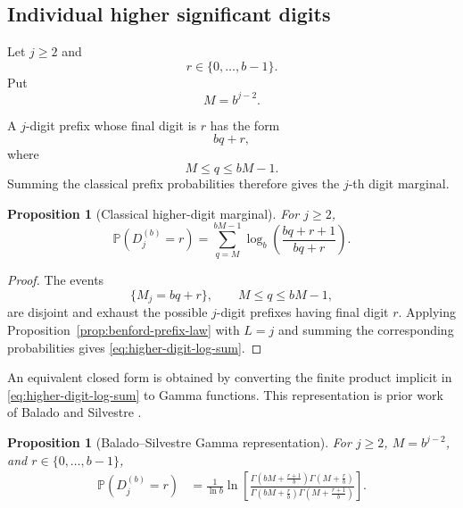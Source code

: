 \documentclass[11pt]{article}
\newtheorem{proposition}[theorem]{Proposition}
\theoremstyle{definition}
\theoremstyle{remark}
\begin{document}
\subsection{Individual higher significant digits}
\label{subsec:higher-digit-laws}

Let \(j\ge2\) and
\[
    r\in\{0,\ldots,b-1\}.
\]
Put
\begin{equation}
    M=b^{j-2}.
    \label{eq:M-j-definition}
\end{equation}

A \(j\)-digit prefix whose final digit is \(r\) has the form
\[
    bq+r,
\]
where
\[
    M\le q\le bM-1.
\]
Summing the classical prefix probabilities therefore gives the
\(j\)-th digit marginal.

\begin{proposition}[Classical higher-digit marginal]
\label{prop:higher-digit-marginal}
For \(j\ge2\),
\begin{equation}
\boxed{
    \mathbb P(D_j^{(b)}=r)
    =
    \sum_{q=M}^{bM-1}
    \log_b
    \left(
        \frac{bq+r+1}{bq+r}
    \right).
}
\label{eq:higher-digit-log-sum}
\end{equation}
\end{proposition}

\begin{proof}
The events
\[
    \{M_j=bq+r\},
    \qquad M\le q\le bM-1,
\]
are disjoint and exhaust the possible \(j\)-digit prefixes having
final digit \(r\).  Applying
Proposition~\ref{prop:benford-prefix-law} with \(L=j\) and summing the
corresponding probabilities gives
\eqref{eq:higher-digit-log-sum}.
\end{proof}

An equivalent closed form is obtained by converting the finite product
implicit in \eqref{eq:higher-digit-log-sum} to Gamma functions.
This representation is prior work of Balado and Silvestre
\cite{BaladoSilvestre2021,BaladoSilvestre2024}.

\begin{proposition}[Balado--Silvestre Gamma representation]
\label{prop:balado-silvestre-gamma}
For \(j\ge2\), \(M=b^{j-2}\), and
\(r\in\{0,\ldots,b-1\}\),
\begin{equation}
\boxed{
\begin{aligned}
    \mathbb P(D_j^{(b)}=r)
    &=
    \frac{1}{\ln b}
    \ln
    \left[
    \frac{
        \Gamma\!\left(bM+\frac{r+1}{b}\right)
        \Gamma\!\left(M+\frac{r}{b}\right)
    }{
        \Gamma\!\left(bM+\frac{r}{b}\right)
        \Gamma\!\left(M+\frac{r+1}{b}\right)
    }
    \right].
\end{aligned}
}
\label{eq:higher-digit-gamma}
\end{equation}
\end{proposition}
\end{document}
